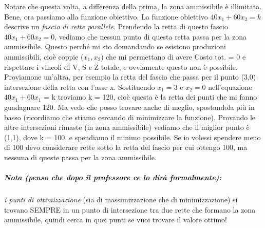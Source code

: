 
\noindent Notare che questa volta, a differenza della prima, la zona ammissibile è illimitata. Bene, ora passiamo alla funzione obiettivo. La funzione obiettivo $40x_1 + 60x_2 = k$ descrive un \textit{fascio di rette parallele}. Prendendo la retta di questo fascio $40x_1+60x_2 = 0$, vediamo che nessun punto di questa retta passa per la zona ammissibile. Questo perché mi sto domandando se esistono produzioni ammissibili, cioè coppie ($x_1,x_2$) che mi permettano di avere Costo tot. = 0 e rispettare i vincoli di V, S e Z totale, e ovviamente questo non è possibile. Proviamone un'altra, per esempio la retta del fascio che passa per il punto (3,0) intersezione della retta con l'asse x. Sostituendo $x_1 = 3$ e $x_2 = 0$ nell'equazione $40x_1 + 60x_1$ = k troviamo k = 120, cioè questa è la retta dei punti che mi fanno guadagnare 120. Ma vedo che posso trovare anche di meglio, spostandola più in basso (ricordiamo che stiamo cercando di minimizzare la funzione). Provando le altre intersezioni rimaste (in zona ammissibile) vediamo che il miglior punto è (1,1), dove k = 100, e spendiamo il minimo possibile. Se io volessi spendere meno di 100 devo considerare rette sotto la retta del fascio per cui ottengo 100, ma nessuna di queste passa per la zona ammissibile.

\subparagraph{Nota (penso che dopo il professore ce lo dirà formalmente):} \textit{i punti di ottimizzazione} (sia di massimizzazione che di minimizzazione) si trovano SEMPRE in un punto di intersezione tra due rette che formano la zona ammissibile, quindi cerca in quei punti se vuoi trovare il valore ottimo!


